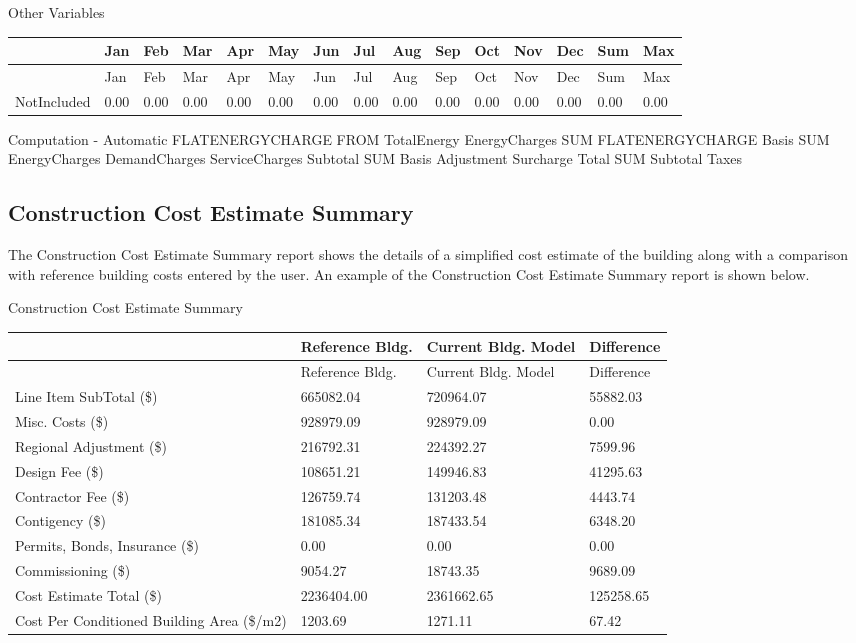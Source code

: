 Other Variables

{\scriptsize
\begin{longtable}[c]{>{\raggedright}p{0.4in}>{\raggedright}p{0.4in}>{\raggedright}p{0.4in}>{\raggedright}p{0.4in}>{\raggedright}p{0.4in}>{\raggedright}p{0.4in}>{\raggedright}p{0.4in}>{\raggedright}p{0.4in}>{\raggedright}p{0.4in}>{\raggedright}p{0.4in}>{\raggedright}p{0.4in}>{\raggedright}p{0.4in}>{\raggedright}p{0.4in}>{\raggedright}p{0.4in}>{\raggedright}p{0.4in}}
\toprule 
~ & Jan & Feb & Mar & Apr & May & Jun & Jul & Aug & Sep & Oct & Nov & Dec & Sum & Max \tabularnewline
\midrule
\endfirsthead

\toprule 
~ & Jan & Feb & Mar & Apr & May & Jun & Jul & Aug & Sep & Oct & Nov & Dec & Sum & Max \tabularnewline
\midrule
\endhead

NotIncluded & 0.00 & 0.00 & 0.00 & 0.00 & 0.00 & 0.00 & 0.00 & 0.00 & 0.00 & 0.00 & 0.00 & 0.00 & 0.00 & 0.00 \tabularnewline
\bottomrule
\end{longtable}}

Computation - Automatic FLATENERGYCHARGE FROM TotalEnergy EnergyCharges SUM FLATENERGYCHARGE Basis SUM EnergyCharges DemandCharges ServiceCharges Subtotal SUM Basis Adjustment Surcharge Total SUM Subtotal Taxes

\subsection{Construction Cost Estimate Summary}\label{construction-cost-estimate-summary}

The Construction Cost Estimate Summary report shows the details of a simplified cost estimate of the building along with a comparison with reference building costs entered by the user. An example of the Construction Cost Estimate Summary report is shown below.

Construction Cost Estimate Summary

\begin{longtable}[c]{>{\raggedright}p{1.5in}>{\raggedright}p{1.5in}>{\raggedright}p{1.5in}>{\raggedright}p{1.5in}}
\toprule 
~ & Reference Bldg. & Current Bldg. Model & Difference \tabularnewline
\midrule
\endfirsthead

\toprule 
~ & Reference Bldg. & Current Bldg. Model & Difference \tabularnewline
\midrule
\endhead

Line Item SubTotal (\$) & 665082.04 & 720964.07 & 55882.03 \tabularnewline
Misc. Costs (\$) & 928979.09 & 928979.09 & 0.00 \tabularnewline
Regional Adjustment (\$) & 216792.31 & 224392.27 & 7599.96 \tabularnewline
Design Fee (\$) & 108651.21 & 149946.83 & 41295.63 \tabularnewline
Contractor Fee (\$) & 126759.74 & 131203.48 & 4443.74 \tabularnewline
Contigency (\$) & 181085.34 & 187433.54 & 6348.20 \tabularnewline
Permits, Bonds, Insurance (\$) & 0.00 & 0.00 & 0.00 \tabularnewline
Commissioning (\$) & 9054.27 & 18743.35 & 9689.09 \tabularnewline
Cost Estimate Total (\$) & 2236404.00 & 2361662.65 & 125258.65 \tabularnewline
Cost Per Conditioned Building Area (\$/m2) & 1203.69 & 1271.11 & 67.42 \tabularnewline
\bottomrule
\end{longtable}

